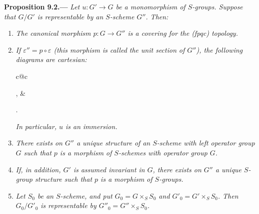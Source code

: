 \medskip
{}\label{prop:sga3-VIB-9.2}%
\noindent\textbf{Proposition 9.2.---}
\emph{Let \(u:G'\to G\) be a monomorphism of \(S\)-groups.
Suppose that \(G/G'\) is representable by an \(S\)-scheme \(G''\).
Then:}
\begin{enumerate}
\item[\textup{(i)}]\label{concl:sga3-VIB-9.2-i}
  \emph{The canonical morphism \(p:G\to G''\) is a covering for
  the \textup{(fpqc)} topology.}

\item[\textup{(ii)}]\label{concl:sga3-VIB-9.2-ii}
  \emph{If \(\varepsilon''=p\circ\varepsilon\)
  \textup{(this morphism is called the unit section of \(G''\))},
  the following diagrams are cartesian:}
  \begin{center}
    \label{diag:sga3-VIB-9.2-cartesian}%
    \begin{tabular}{c@{\qquad}c}
      ,
      &
      .
    \end{tabular}
  \end{center}
  \emph{In particular, \(u\) is an immersion.}

\item[\textup{(iii)}]\label{concl:sga3-VIB-9.2-iii}
  \emph{There exists on \(G''\) a unique structure of an
  \(S\)-scheme with left operator group \(G\) such that \(p\) is a
  morphism of \(S\)-schemes with operator group \(G\).}

\item[\textup{(iv)}]\label{concl:sga3-VIB-9.2-iv}
  \emph{If, in addition, \(G'\) is assumed invariant in \(G\),
  there exists on \(G''\) a unique \(S\)-group structure such that
  \(p\) is a morphism of \(S\)-groups.}

\item[\textup{(v)}]\label{concl:sga3-VIB-9.2-v}
  \emph{Let \(S_0\) be an \(S\)-scheme, and put
  \(G_0=G\times_SS_0\) and \(G'_0=G'\times_SS_0\). Then
  \(G_0/G'_0\) is representable by
  \(G''_0=G''\times_SS_0\).}%


\end{enumerate}
